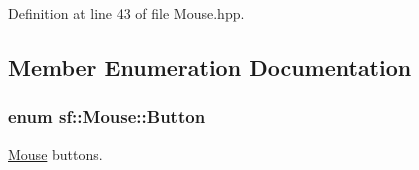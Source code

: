 Definition at line 43 of file Mouse.\-hpp.



\subsection{Member Enumeration Documentation}
\hypertarget{classsf_1_1Mouse_a4fb128be433f9aafe66bc0c605daaa90}{
\subsubsection[{Button}]{\setlength{\rightskip}{0pt plus 5cm}enum {\bf sf\-::\-Mouse\-::\-Button}}}\label{classsf_1_1Mouse_a4fb128be433f9aafe66bc0c605daaa90}


\hyperlink{classsf_1_1Mouse}{Mouse} buttons. 

